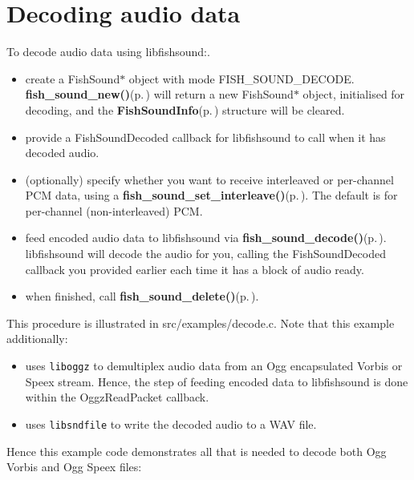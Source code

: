 \section{Decoding audio data}
\label{group__decode}
To decode audio data using libfishsound:.  
\begin{itemize}
\item create a Fish\-Sound$\ast$ object with mode FISH\_\-SOUND\_\-DECODE. {\bf fish\_\-sound\_\-new()}{\rm (p.\,\pageref{fishsound_8h_a4})} will return a new Fish\-Sound$\ast$ object, initialised for decoding, and the {\bf Fish\-Sound\-Info}{\rm (p.\,\pageref{structFishSoundInfo})} structure will be cleared.\item provide a Fish\-Sound\-Decoded callback for libfishsound to call when it has decoded audio.\item (optionally) specify whether you want to receive interleaved or per-channel PCM data, using a {\bf fish\_\-sound\_\-set\_\-interleave()}{\rm (p.\,\pageref{fishsound_8h_a14})}. The default is for per-channel (non-interleaved) PCM.\item feed encoded audio data to libfishsound via {\bf fish\_\-sound\_\-decode()}{\rm (p.\,\pageref{fishsound_8h_a7})}. libfishsound will decode the audio for you, calling the Fish\-Sound\-Decoded callback you provided earlier each time it has a block of audio ready.\item when finished, call {\bf fish\_\-sound\_\-delete()}{\rm (p.\,\pageref{fishsound_8h_a11})}.\end{itemize}


This procedure is illustrated in src/examples/decode.c. Note that this example additionally:\begin{itemize}
\item uses {\tt liboggz} to demultiplex audio data from an Ogg encapsulated Vorbis or Speex stream. Hence, the step of feeding encoded data to libfishsound is done within the Oggz\-Read\-Packet callback.\item uses {\tt libsndfile} to write the decoded audio to a WAV file.\end{itemize}


Hence this example code demonstrates all that is needed to decode both Ogg Vorbis and Ogg Speex files:



